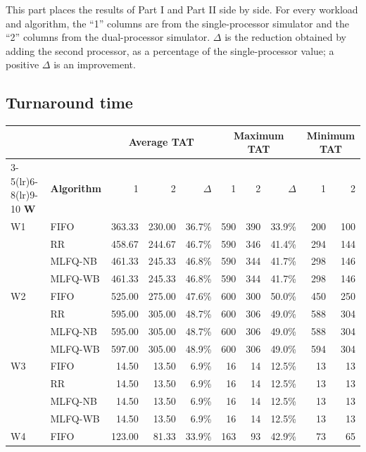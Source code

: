 \documentclass[11pt,a4paper]{article}
\begin{document}
This part places the results of Part I and Part II side by side. For every workload and
algorithm, the ``1'' columns are from the single-processor simulator and the ``2'' columns
from the dual-processor simulator. $\Delta$ is the reduction obtained by adding the second
processor, as a percentage of the single-processor value; a positive $\Delta$ is an
improvement.

\subsection{Turnaround time}

\begin{center}\footnotesize\setlength{\tabcolsep}{4.5pt}
\begin{tabular}{ll rrr rrr rr}
\toprule
& & \multicolumn{3}{c}{\textbf{Average TAT}} & \multicolumn{3}{c}{\textbf{Maximum TAT}} & \multicolumn{2}{c}{\textbf{Minimum TAT}}\\
\cmidrule(lr){3-5}\cmidrule(lr){6-8}\cmidrule(lr){9-10}
\textbf{W} & \textbf{Algorithm} & 1 & 2 & $\Delta$ & 1 & 2 & $\Delta$ & 1 & 2\\
\midrule
W1 & FIFO & 363.33 & 230.00 & 36.7\% & 590 & 390 & 33.9\% & 200 & 100 \\
 & RR & 458.67 & 244.67 & 46.7\% & 590 & 346 & 41.4\% & 294 & 144 \\
 & MLFQ-NB & 461.33 & 245.33 & 46.8\% & 590 & 344 & 41.7\% & 298 & 146 \\
 & MLFQ-WB & 461.33 & 245.33 & 46.8\% & 590 & 344 & 41.7\% & 298 & 146 \\
\midrule
W2 & FIFO & 525.00 & 275.00 & 47.6\% & 600 & 300 & 50.0\% & 450 & 250 \\
 & RR & 595.00 & 305.00 & 48.7\% & 600 & 306 & 49.0\% & 588 & 304 \\
 & MLFQ-NB & 595.00 & 305.00 & 48.7\% & 600 & 306 & 49.0\% & 588 & 304 \\
 & MLFQ-WB & 597.00 & 305.00 & 48.9\% & 600 & 306 & 49.0\% & 594 & 304 \\
\midrule
W3 & FIFO & 14.50 & 13.50 & 6.9\% & 16 & 14 & 12.5\% & 13 & 13 \\
 & RR & 14.50 & 13.50 & 6.9\% & 16 & 14 & 12.5\% & 13 & 13 \\
 & MLFQ-NB & 14.50 & 13.50 & 6.9\% & 16 & 14 & 12.5\% & 13 & 13 \\
 & MLFQ-WB & 14.50 & 13.50 & 6.9\% & 16 & 14 & 12.5\% & 13 & 13 \\
\midrule
W4 & FIFO & 123.00 & 81.33 & 33.9\% & 163 & 93 & 42.9\% & 73 & 65 \\

\end{tabular}
\end{center}
\end{document}
